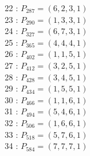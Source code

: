 \documentclass{article}
\begin{document}
{\begin{multicols}{2}
22 : $P_{287}=( 6, 2, 3, 1 )$\\
23 : $P_{290}=( 1, 3, 3, 1 )$\\
24 : $P_{327}=( 6, 7, 3, 1 )$\\
25 : $P_{365}=( 4, 4, 4, 1 )$\\
26 : $P_{402}=( 1, 1, 5, 1 )$\\
27 : $P_{412}=( 3, 2, 5, 1 )$\\
28 : $P_{428}=( 3, 4, 5, 1 )$\\
29 : $P_{434}=( 1, 5, 5, 1 )$\\
30 : $P_{466}=( 1, 1, 6, 1 )$\\
31 : $P_{494}=( 5, 4, 6, 1 )$\\
32 : $P_{506}=( 1, 6, 6, 1 )$\\
33 : $P_{518}=( 5, 7, 6, 1 )$\\
34 : $P_{584}=( 7, 7, 7, 1 )$\\
\end{multicols}
}
\end{document}
